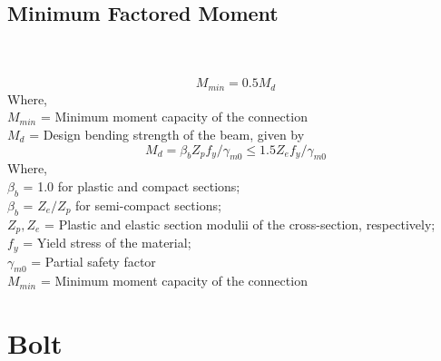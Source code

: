 \documentclass[11.5pt,a4paper,oneside]{report}
\newcommand{\okornot}{ \vspace{15mm} \hrule
	\noindent \\ \\
	Is this check \qquad
	\CheckBox[checked=False, name= ok]{\textbf{Ok}} \qquad / 
	\CheckBox[checked=False, name= notok]{\textbf{Not Ok}}\\ \\
	Comments \\ \\
	\noindent
	\TextField[name=multilinetextbox, multiline=true, width=1.0\linewidth,height=2in]{}}
\begin{document}
\begin{Form}
\section{Minimum Factored Moment} 
\qquad \qquad[Reference: Cl. 10.7, b-1, IS 800 : 2007] \\ \\
	\begin{equation}\label{eq:cl_10.7b, IS 800}
		M_{min} = 0.5 M_d 
	\end{equation}
	Where, \\
		\indent $M_{min}$ = Minimum moment capacity of the connection \\
		\indent $M_d$ = Design bending strength of the beam, given by
	\begin{equation} \label{eq:cl_8.2.1.2a, IS 800}
		M_d = \beta_b Z_p f_y / \gamma_{m0} \le 1.5 Z_e f_y / \gamma_{m0} 
	\end{equation}
	Where, \\
		\indent $\beta_b$ = 1.0 for plastic and compact sections;\\
		\indent $\beta_b$ = $Z_e/Z_p$ for semi-compact sections;\\
		
		
		\indent $Z_p, Z_e$ = Plastic and elastic section modulii of the cross-section, respectively; \\
		\indent $f_y$ = Yield stress of the material;\\
		\indent $\gamma_{m0}$ = Partial safety factor \\
		\indent $M_{min}$ = Minimum moment capacity of the connection


\chapter{Bolt}
%

\end{Form}
\end{document}
